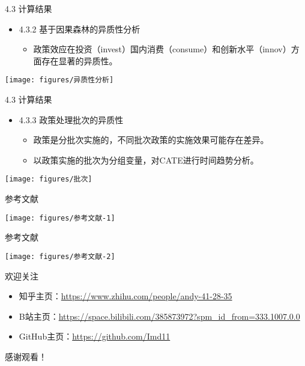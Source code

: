 \documentclass{beamer}%
\begin{document}
\begin{frame}[t]{\large 4.3 计算结果}
\begin{itemize}
  \item 4.3.2 基于因果森林的异质性分析
  \begin{itemize}
  \item 政策效应在投资（invest）国内消费（consume）和创新水平（innov）方面存在显著的异质性。
  \end{itemize}
\end{itemize}

\vspace{-0.4cm} %
\begin{center}
		\texttt{[image: figures/异质性分析]}
\end{center}
\end{frame}


\begin{frame}[t]{\large 4.3 计算结果}
\begin{itemize}
  \item 4.3.3 政策处理批次的异质性
  \begin{itemize}
  \item 政策是分批次实施的，不同批次政策的实施效果可能存在差异。
  \item 以政策实施的批次为分组变量，对CATE进行时间趋势分析。
  \end{itemize}
\end{itemize}
\begin{center}
		\texttt{[image: figures/批次]}
\end{center}
\end{frame}


\begin{frame}[c]{参考文献}
\vspace{-0.5cm} %
\begin{center}
	\texttt{[image: figures/参考文献-1]}
\end{center}
\end{frame}


\begin{frame}[c]{参考文献}
\vspace{-0.8cm} %
\begin{center}
	\texttt{[image: figures/参考文献-2]}
\end{center}
\end{frame}

\begin{frame}[c]{欢迎关注}
\begin{itemize}
  \item 知乎主页：\href{https://www.zhihu.com/people/andy-41-28-35}{https://www.zhihu.com/people/andy-41-28-35}
  \item B站主页：\href{https://space.bilibili.com/385873972?spm_id_from=333.1007.0.0}{https://space.bilibili.com/385873972?spm\_id\_from=333.1007.0.0}
  \item GitHub主页：\href{https://github.com/Imd11}{https://github.com/Imd11}
\end{itemize}
\end{frame}


\begin{frame}[c]
\begin{center}
   \LARGE 感谢观看！
\end{center}
\end{frame}

	
	
\end{document}
